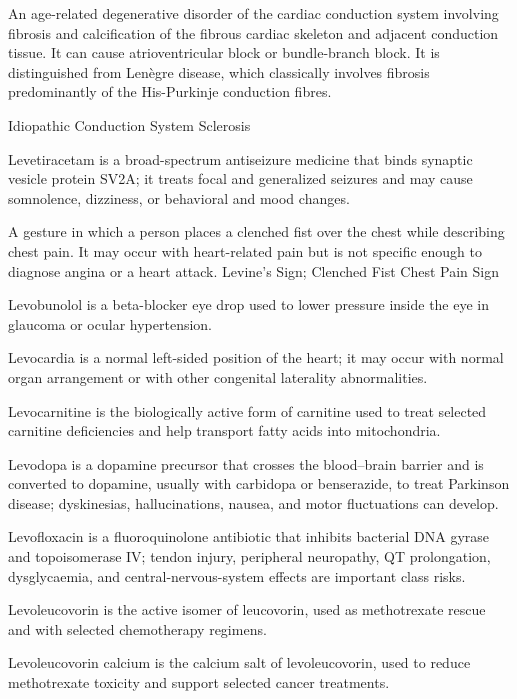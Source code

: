  An age-related degenerative disorder of the cardiac conduction system involving fibrosis and calcification of the fibrous cardiac skeleton and adjacent conduction tissue. It can cause atrioventricular block or bundle-branch block. It is distinguished from Lenègre disease, which classically involves fibrosis predominantly of the His-Purkinje conduction fibres.

\synonyms
Idiopathic Conduction System Sclerosis

 Levetiracetam is a broad-spectrum antiseizure medicine that binds synaptic vesicle protein SV2A; it treats focal and generalized seizures and may cause somnolence, dizziness, or behavioral and mood changes.

 A gesture in which a person places a clenched fist over the chest while describing chest pain. It may occur with heart-related pain but is not specific enough to diagnose angina or a heart attack.
\synonyms
Levine's Sign; Clenched Fist Chest Pain Sign

 Levobunolol is a beta-blocker eye drop used to lower pressure inside the eye in glaucoma or ocular hypertension.

 Levocardia is a normal left-sided position of the heart; it may occur with normal organ arrangement or with other congenital laterality abnormalities.

 Levocarnitine is the biologically active form of carnitine used to treat selected carnitine deficiencies and help transport fatty acids into mitochondria.

 Levodopa is a dopamine precursor that crosses the blood--brain barrier and is converted to dopamine, usually with carbidopa or benserazide, to treat Parkinson disease; dyskinesias, hallucinations, nausea, and motor fluctuations can develop.

 Levofloxacin is a fluoroquinolone antibiotic that inhibits bacterial DNA gyrase and topoisomerase IV; tendon injury, peripheral neuropathy, QT prolongation, dysglycaemia, and central-nervous-system effects are important class risks.

 Levoleucovorin is the active isomer of leucovorin, used as methotrexate rescue and with selected chemotherapy regimens.

 Levoleucovorin calcium is the calcium salt of levoleucovorin, used to reduce methotrexate toxicity and support selected cancer treatments.

